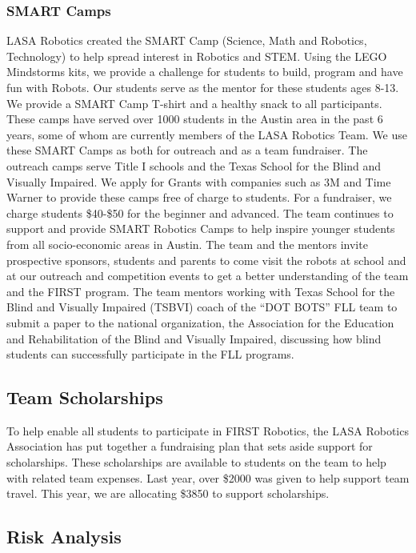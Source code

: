 \subsubsection{SMART Camps}
LASA Robotics created the SMART Camp (Science, Math and Robotics, Technology) to help spread interest in Robotics and STEM.  Using the LEGO Mindstorms kits, we provide a challenge for students to build, program and have fun with Robots. Our students serve as the mentor for these students ages 8-13.  We provide a SMART Camp T-shirt and a healthy snack to all participants.  These camps have served over 1000 students in the Austin area in the past 6 years, some of whom are currently members of the LASA Robotics Team.  We use these SMART Camps as both for outreach and as a team fundraiser. The outreach camps serve Title I schools and the Texas School for the Blind and Visually Impaired.  We apply for Grants with companies such as 3M and Time Warner to provide these camps free of charge to students.  For a fundraiser, we charge students \$40-\$50 for the beginner and advanced.  The team continues to support and provide SMART Robotics Camps to help inspire younger students from all socio-economic areas in Austin. The team and the mentors invite prospective sponsors, students and parents to come visit the robots at school and at our outreach and competition events to get a better understanding of the team and the FIRST program. The team mentors working with Texas School for the Blind and Visually Impaired (TSBVI) coach of the “DOT BOTS” FLL team to submit a paper to the national organization, the Association for the Education and Rehabilitation of the Blind and Visually Impaired, discussing how blind students can successfully participate in the FLL programs.

\subsection{Team Scholarships}
To help enable all students to participate in FIRST Robotics, the LASA Robotics Association has put together a fundraising plan that sets aside support for scholarships. These scholarships are available to students on the team to help with related team expenses. Last year, over \$2000 was given to help support team travel. This year, we are allocating \$3850 to support scholarships.

\subsection{Risk Analysis}
